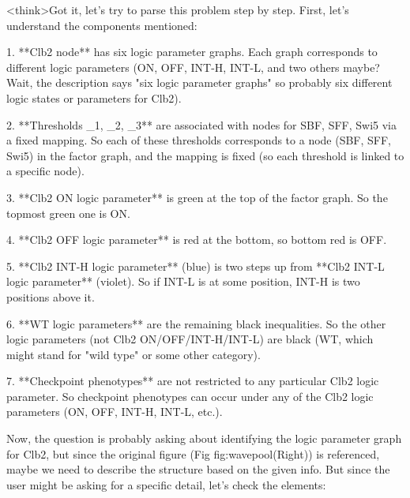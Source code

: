 <think>Got it, let's try to parse this problem step by step. First, let's understand the components mentioned:

1. **Clb2 node** has six logic parameter graphs. Each graph corresponds to different logic parameters (ON, OFF, INT-H, INT-L, and two others maybe? Wait, the description says "six logic parameter graphs" so probably six different logic states or parameters for Clb2).

2. **Thresholds _1, _2, _3** are associated with nodes for SBF, SFF, Swi5 via a fixed mapping. So each of these thresholds corresponds to a node (SBF, SFF, Swi5) in the factor graph, and the mapping is fixed (so each threshold is linked to a specific node).

3. **Clb2 ON logic parameter** is green at the top of the factor graph. So the topmost green one is ON.

4. **Clb2 OFF logic parameter** is red at the bottom, so bottom red is OFF.

5. **Clb2 INT-H logic parameter** (blue) is two steps up from **Clb2 INT-L logic parameter** (violet). So if INT-L is at some position, INT-H is two positions above it.

6. **WT logic parameters** are the remaining black inequalities. So the other logic parameters (not Clb2 ON/OFF/INT-H/INT-L) are black (WT, which might stand for "wild type" or some other category).

7. **Checkpoint phenotypes** are not restricted to any particular Clb2 logic parameter. So checkpoint phenotypes can occur under any of the Clb2 logic parameters (ON, OFF, INT-H, INT-L, etc.).

Now, the question is probably asking about identifying the logic parameter graph for Clb2, but since the original figure (Fig fig:wavepool(Right)) is referenced, maybe we need to describe the structure based on the given info. But since the user might be asking for a specific detail, let's check the elements:

